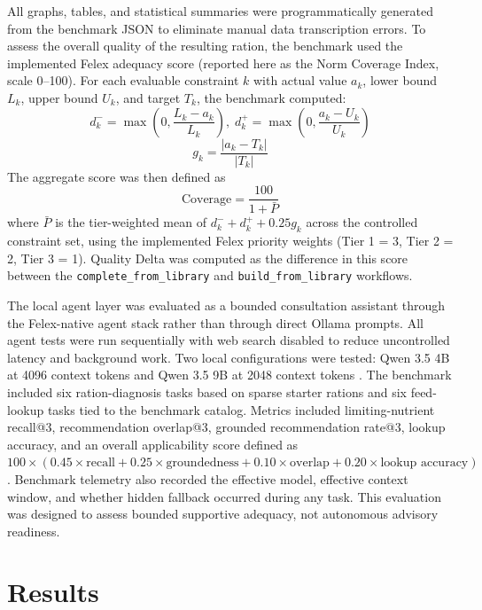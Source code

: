 \documentclass[a4paper,fleqn]{cas-dc}
\begin{document}
All graphs, tables, and statistical summaries were programmatically generated from the benchmark JSON to eliminate manual data transcription errors. To assess the overall quality of the resulting ration, the benchmark used the implemented Felex adequacy score (reported here as the Norm Coverage Index, scale 0--100). For each evaluable constraint $k$ with actual value $a_k$, lower bound $L_k$, upper bound $U_k$, and target $T_k$, the benchmark computed:
\begin{equation}
 d^-_k = \max\!\left(0, \frac{L_k - a_k}{L_k}\right), \;
 d^+_k = \max\!\left(0, \frac{a_k - U_k}{U_k}\right)
\end{equation}
\begin{equation}
 g_k = \frac{|a_k - T_k|}{|T_k|}
\end{equation}
The aggregate score was then defined as
\begin{equation}
\text{Coverage} = \frac{100}{1 + \bar{P}}
\end{equation}
where $\bar{P}$ is the tier-weighted mean of $d^-_k + d^+_k + 0.25 g_k$ across the controlled constraint set, using the implemented Felex priority weights (Tier 1 = 3, Tier 2 = 2, Tier 3 = 1). Quality Delta was computed as the difference in this score between the \texttt{complete\_from\_library} and \texttt{build\_from\_library} workflows.

The local agent layer was evaluated as a bounded consultation assistant through the Felex-native agent stack rather than through direct Ollama prompts. All agent tests were run sequentially with web search disabled to reduce uncontrolled latency and background work. Two local configurations were tested: Qwen 3.5 4B at 4096 context tokens and Qwen 3.5 9B at 2048 context tokens \citep{qwen2023, ollama2023}. The benchmark included six ration-diagnosis tasks based on sparse starter rations and six feed-lookup tasks tied to the benchmark catalog. Metrics included limiting-nutrient recall@3, recommendation overlap@3, grounded recommendation rate@3, lookup accuracy, and an overall applicability score defined as $100 \times (0.45 \times \text{recall} + 0.25 \times \text{groundedness} + 0.10 \times \text{overlap} + 0.20 \times \text{lookup accuracy})$. Benchmark telemetry also recorded the effective model, effective context window, and whether hidden fallback occurred during any task. This evaluation was designed to assess bounded supportive adequacy, not autonomous advisory readiness.

\section{Results}\label{sec:results}
\end{document}
